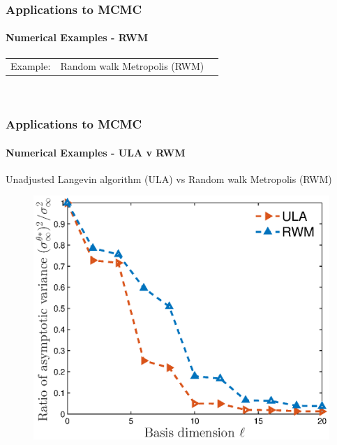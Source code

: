 \documentclass[xcolor=dvipsnames, subsection=false]{beamer}
\def\alertb#1{\alert{\color{BrickRed}  #1}}
\def\alertb#1{\alert{\color{BrickRed}  #1}}
\begin{document}
\begin{frame}
\frametitle{Applications to MCMC}
\framesubtitle{Numerical Examples - RWM}
\begin{tabular}{lll}\alertb{Example:}   & Random walk Metropolis (RWM)
	\\
\end{tabular}
\begin{figure}
\centering
 \mbox{
} 
\end{figure}
\end{frame}


\begin{frame}
\frametitle{Applications to MCMC}
\framesubtitle{Numerical Examples - ULA v RWM}
Unadjusted Langevin algorithm (ULA) vs Random walk Metropolis (RWM) \\[-0.2cm]
\begin{figure}[h]
	\includegraphics[width = .6\hsize]{Chap5_rel_red_lang_mh_all.eps}
	\label{lang_mh}
\end{figure}
\end{frame}
\end{document}

